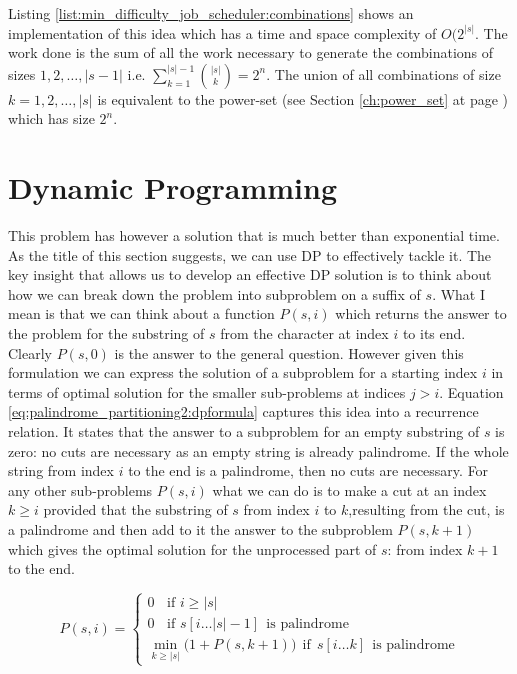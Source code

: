 Listing \ref{list:min_difficulty_job_scheduler:combinations} shows an implementation of this idea
which has a time and space complexity of $O(2^{|s|}$. The work done is the sum of all the work
necessary to generate the combinations of sizes $1,2,\ldots,|s-1|$ i.e. $\sum_{k=1}^{|s|-1} {|s|
\choose k} = 2^n$. The union of all combinations of size $k=1,2,\ldots,|s|$ is equivalent to the
power-set (see Section \ref{ch:power_set} at page \pageref{sec:powerset:discussion}) which has size
$2^n$.




\section{Dynamic Programming}
\label{sec:palindrome_partitioning2:DP}
This problem has however a solution that is much better than exponential time. As the title of this
section suggests, we can use DP to effectively tackle it. The key insight that allows us to develop
an effective DP solution is to think about how we can break down the problem into subproblem on a
suffix of $s$. What I mean is that we can think about a function $P(s, i)$ which returns the answer
to the problem for the substring of $s$ from the character at index $i$ to its end. Clearly $P(s,0)$
is the answer to the general question. However given this formulation  we can express the solution
of a subproblem for a starting index $i$ in terms of optimal solution for the smaller sub-problems
at indices $j>i$. Equation \ref{eq:palindrome_partitioning2:dpformula} captures this idea into a
recurrence relation. It states that the answer to a subproblem for an empty substring of $s$ is
zero: no cuts are necessary as an empty string is already palindrome. If the whole string from index
$i$ to the end is a palindrome, then no cuts are necessary. For any other sub-problems $P(s,i)$ what
we can do is to make a cut at an index $k\geq i$ provided that  the  substring of $s$ from index $i$
to $k$,resulting from the cut, is a palindrome and then add to it the answer to the subproblem
$P(s,k+1)$ which gives the optimal solution for the unprocessed part of $s$: from index $k+1$ to the
end.

\begin{equation}
	P(s, i) = \begin{cases}
		0 \; \; \text{ if } i \geq |s|  \\
		0 \; \; \text{ if } s[i\ldots |s|-1]  \:\: \text{is palindrome}  \\
		\min_{k\geq |s|} \big( 1 + P(s,k+1) \big) \: \: \text{if} \: \: s[i\ldots k]  \:\: \text{is palindrome}
	 \end{cases}
	\label{eq:palindrome_partitioning2:dpformula}
\end{equation}

